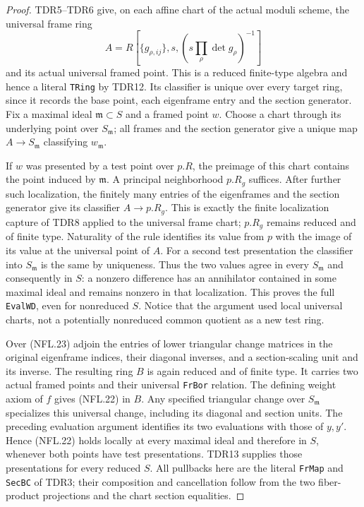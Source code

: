 \documentclass[11pt,a4paper]{article}
\numberwithin{equation}{section}
\theoremstyle{remark}\newtheorem{remark}[theorem]{Remark}
\begin{document}
\begin{proof}
TDR5--TDR6 give, on each affine chart of the actual moduli scheme,
the universal frame ring
\[
 A=R[\{g_{\rho,ij}\},s,
           (s\prod_\rho\det g_\rho)^{-1}]
 \tag{NFL.23}
\]
and its actual universal framed point.  This is a reduced
finite-type algebra and hence a literal \texttt{TRing} by TDR12.
Its classifier is unique over every target ring, since it records
the base point, each eigenframe entry and the section generator.
Fix a maximal ideal $\mathfrak m\subset S$ and a framed point $w$.
Choose a chart through its underlying point over $S_\mathfrak m$;
all frames and the section generator give a unique map
$A\to S_\mathfrak m$ classifying $w_\mathfrak m$.

If $w$ was presented by a test point over $p.R$, the preimage
of this chart contains the point induced by $\mathfrak m$.
A principal neighborhood $p.R_g$ suffices.  After further such
localization, the finitely many entries of the eigenframes and
the section generator give its classifier $A\to p.R_g$.
This is exactly the finite localization capture of TDR8 applied
to the universal frame chart; $p.R_g$ remains reduced and of
finite type.  Naturality of the rule identifies its value from
$p$ with the image of its value at the universal point of $A$.
For a second test presentation the classifier into $S_\mathfrak m$
is the same by uniqueness.  Thus the two values agree in every
$S_\mathfrak m$ and consequently in $S$: a nonzero difference
has an annihilator contained in some maximal ideal and remains
nonzero in that localization.  This proves the full
\texttt{Eval\allowbreak WD}, even for nonreduced $S$.  Notice that the
argument used local universal charts, not a potentially
nonreduced common quotient as a new test ring.

Over (NFL.23) adjoin the entries of lower triangular change
matrices in the original eigenframe indices, their diagonal
inverses, and a section-scaling unit and its inverse.  The resulting
ring $B$ is again reduced and of finite type.  It carries two
actual framed points and their universal \texttt{Fr\allowbreak Bor} relation.
The defining weight axiom of $f$ gives (NFL.22) in $B$.
Any specified triangular change over $S_\mathfrak m$ specializes
this universal change, including its diagonal and section units.
The preceding evaluation argument identifies its two evaluations
with those of $y,y'$.  Hence (NFL.22) holds locally at every
maximal ideal and therefore in $S$, whenever both points have
test presentations.  TDR13 supplies those presentations for
every reduced $S$.  All pullbacks here are the literal
\texttt{Fr\allowbreak Map} and \texttt{Sec\allowbreak BC} of TDR3; their composition
and cancellation follow from the two fiber-product projections
and the chart section equalities.
\end{proof}
\end{document}

